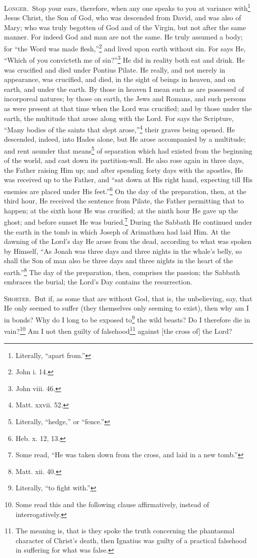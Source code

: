 \textsc{Longer.}~Stop your ears, therefore, when any one speaks to you at variance with\footnote{Literally, “apart from.”} Jesus Christ, the Son of God, who was descended from David, and was also of Mary; who was truly begotten of God and of the Virgin, but not after the same manner. For indeed God and man are not the same. He truly assumed a body; for “the Word was made flesh,”\footnote{John i. 14.} and lived upon earth without sin. For says He, “Which of you convicteth me of sin?”\footnote{John viii. 46.} He did in reality both eat and drink. He was crucified and died under Pontius Pilate. He really, and not merely in appearance, was crucified, and died, in the sight of beings in heaven, and on earth, and under the earth. By those in heaven I mean such as are possessed of incorporeal natures; by those on earth, the Jews and Romans, and such persons as were present at that time when the Lord was crucified; and by those under the earth, the multitude that arose along with the Lord. For says the Scripture, “Many bodies of the saints that slept arose,”\footnote{Matt. xxvii. 52.} their graves being opened. He descended, indeed, into Hades alone, but He arose accompanied by a multitude; and rent asunder that means\footnote{Literally, “hedge,” or “fence.”} of separation which had existed from the beginning of the world, and cast down its partition-wall. He also rose again in three days, the Father raising Him up; and after spending forty days with the apostles, He was received up to the Father, and “sat down at His right hand, expecting till His enemies are placed under His feet.”\footnote{Heb. x. 12, 13.} On the day of the preparation, then, at the third hour, He received the sentence from Pilate, the Father permitting that to happen; at the sixth hour He was crucified; at the ninth hour He gave up the ghost; and before sunset He was buried.\footnote{Some read, “He was taken down from the cross, and laid in a new tomb.”} During the Sabbath He continued under the earth in the tomb in which Joseph of Arimathæa had laid Him. At the dawning of the Lord’s day He arose from the dead, according to what was spoken by Himself, “As Jonah was three days and three nights in the whale’s belly, so shall the Son of man also be three days and three nights in the heart of the earth.”\footnote{Matt. xii. 40.} The day of the preparation, then, comprises the passion; the Sabbath embraces the burial; the Lord’s Day contains the resurrection.


\textsc{Shorter.}~But if, as some that are without God, that is, the unbelieving, say, that He only seemed to suffer (they themselves only seeming to exist), then why am I in bonds? Why do I long to be exposed to\footnote{Literally, “to fight with.”} the wild beasts? Do I therefore die in vain?\footnote{Some read this and the following clause affirmatively, instead of interrogatively.} Am I not then guilty of falsehood\footnote{The meaning is, that is they spoke the truth concerning the phantasmal character of Christ’s death, then Ignatius was guilty of a practical falsehood in suffering for what was false.} against [the cross of] the Lord?

